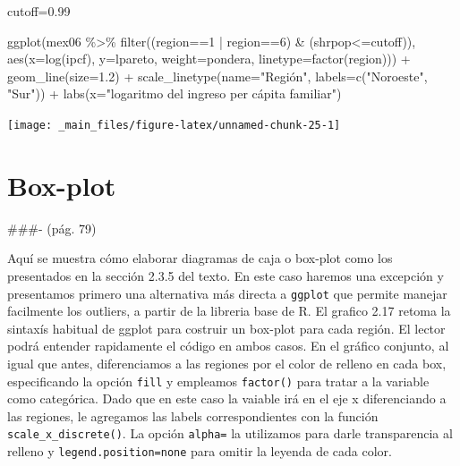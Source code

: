\documentclass[
]{book}
\newenvironment{Shaded}{\begin{snugshade}}{\end{snugshade}}
\newcommand{\AttributeTok}[1]{\textcolor[rgb]{0.77,0.63,0.00}{#1}}
\newcommand{\DecValTok}[1]{\textcolor[rgb]{0.00,0.00,0.81}{#1}}
\newcommand{\FloatTok}[1]{\textcolor[rgb]{0.00,0.00,0.81}{#1}}
\newcommand{\FunctionTok}[1]{\textcolor[rgb]{0.00,0.00,0.00}{#1}}
\newcommand{\NormalTok}[1]{#1}
\newcommand{\OtherTok}[1]{\textcolor[rgb]{0.56,0.35,0.01}{#1}}
\newcommand{\SpecialCharTok}[1]{\textcolor[rgb]{0.00,0.00,0.00}{#1}}
\newcommand{\StringTok}[1]{\textcolor[rgb]{0.31,0.60,0.02}{#1}}
\begin{document}
\begin{Shaded}
\begin{Highlighting}[]
\NormalTok{cutoff}\OtherTok{=}\FloatTok{0.99}

\FunctionTok{ggplot}\NormalTok{(mex06 }\SpecialCharTok{\%\textgreater{}\%} \FunctionTok{filter}\NormalTok{((region}\SpecialCharTok{==}\DecValTok{1} \SpecialCharTok{|}\NormalTok{ region}\SpecialCharTok{==}\DecValTok{6}\NormalTok{) }\SpecialCharTok{\&}\NormalTok{ (shrpop}\SpecialCharTok{\textless{}=}\NormalTok{cutoff)),}
       \FunctionTok{aes}\NormalTok{(}\AttributeTok{x=}\FunctionTok{log}\NormalTok{(ipcf), }\AttributeTok{y=}\NormalTok{lpareto, }\AttributeTok{weight=}\NormalTok{pondera, }\AttributeTok{linetype=}\FunctionTok{factor}\NormalTok{(region))) }\SpecialCharTok{+} 
  \FunctionTok{geom\_line}\NormalTok{(}\AttributeTok{size=}\FloatTok{1.2}\NormalTok{) }\SpecialCharTok{+}
  \FunctionTok{scale\_linetype}\NormalTok{(}\AttributeTok{name=}\StringTok{"Región"}\NormalTok{, }\AttributeTok{labels=}\FunctionTok{c}\NormalTok{(}\StringTok{"Noroeste"}\NormalTok{, }\StringTok{"Sur"}\NormalTok{)) }\SpecialCharTok{+} 
  \FunctionTok{labs}\NormalTok{(}\AttributeTok{x=}\StringTok{"logaritmo del ingreso per cápita familiar"}\NormalTok{)}
\end{Highlighting}
\end{Shaded}

\texttt{[image: \_main\_files/figure-latex/unnamed-chunk-25-1]}

\hypertarget{box-plot}{%
\section{Box-plot}\label{box-plot}}

\#\#\#- (pág. 79)

Aquí se muestra cómo elaborar diagramas de caja o box-plot como los presentados en la sección 2.3.5 del texto. En este caso haremos una excepción y presentamos primero una alternativa más directa a \texttt{ggplot} que permite manejar facilmente los outliers, a partir de la libreria base de R. El grafico 2.17 retoma la sintaxís habitual de ggplot para costruir un box-plot para cada región. El lector podrá entender rapidamente el código en ambos casos. En el gráfico conjunto, al igual que antes, diferenciamos a las regiones por el color de relleno en cada box, especificando la opción \texttt{fill} y empleamos \texttt{factor()} para tratar a la variable como categórica. Dado que en este caso la vaiable irá en el eje x diferenciando a las regiones, le agregamos las labels correspondientes con la función \texttt{scale\_x\_discrete()}. La opción \texttt{alpha=} la utilizamos para darle transparencia al relleno y \texttt{legend.position=none} para omitir la leyenda de cada color.
\end{document}
